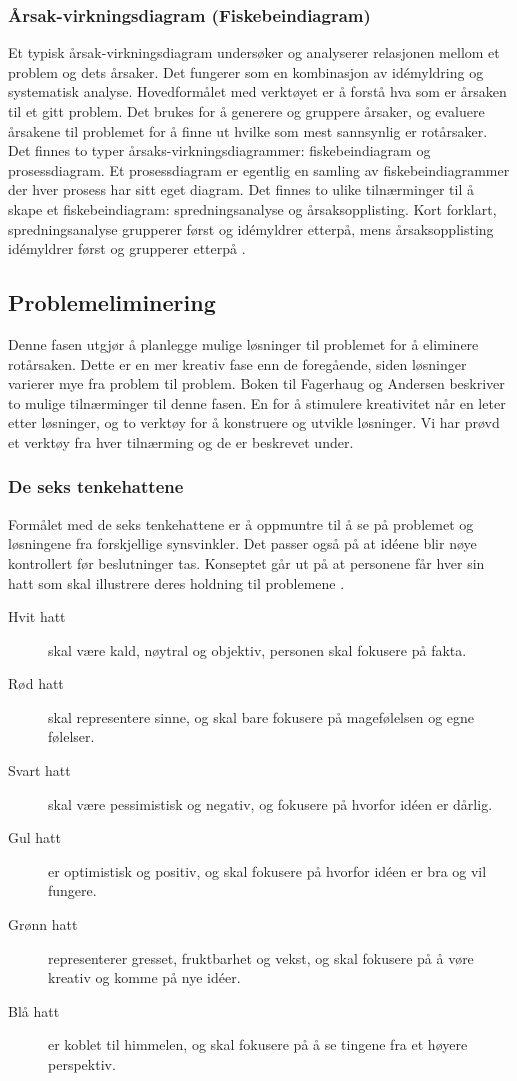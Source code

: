 \subsubsection{Årsak-virkningsdiagram (Fiskebeindiagram)}
Et typisk årsak-virkningsdiagram undersøker og analyserer relasjonen mellom et problem og dets årsaker. Det fungerer som en kombinasjon av idémyldring og systematisk analyse. Hovedformålet med verktøyet er å forstå hva som er årsaken til et gitt problem. Det brukes for å generere og gruppere årsaker, og evaluere årsakene til problemet for å finne ut hvilke som mest sannsynlig er rotårsaker. Det finnes to typer årsaks-virkningsdiagrammer: fiskebeindiagram og prosessdiagram. Et prosessdiagram er egentlig en samling av fiskebeindiagrammer der hver prosess har sitt eget diagram. Det finnes to ulike tilnærminger til å skape et fiskebeindiagram: spredningsanalyse og årsaksopplisting. Kort forklart, spredningsanalyse grupperer først og idémyldrer etterpå, mens årsaksopplisting idémyldrer først og grupperer etterpå \cite{RCA}. 

\subsection{Problemeliminering}
Denne fasen utgjør å planlegge mulige løsninger til problemet for å eliminere rotårsaken. Dette er en mer kreativ fase enn de foregående, siden løsninger varierer mye fra problem til problem. Boken til Fagerhaug og Andersen \cite{RCA} beskriver to mulige tilnærminger til denne fasen. En for å stimulere kreativitet når en leter etter løsninger, og to verktøy for å konstruere og utvikle løsninger. Vi har prøvd et verktøy fra hver tilnærming og de er beskrevet under. 

\subsubsection{De seks tenkehattene}
Formålet med de seks tenkehattene er å oppmuntre til å se på problemet og løsningene fra forskjellige synsvinkler. Det passer også på at idéene blir nøye kontrollert før beslutninger tas. Konseptet går ut på at personene får hver sin hatt som skal illustrere deres holdning til problemene \cite{RCA}. 

\begin{description}
    \item[Hvit hatt] skal være kald, nøytral og objektiv, personen skal fokusere på fakta.
    \item[Rød hatt] skal representere sinne, og skal bare fokusere på magefølelsen og egne følelser.
    \item[Svart hatt] skal være pessimistisk og negativ, og fokusere på hvorfor idéen er dårlig.
    \item[Gul hatt] er optimistisk og positiv, og skal fokusere på hvorfor idéen er bra og vil fungere.
    \item[Grønn hatt] representerer gresset, fruktbarhet og vekst, og skal fokusere på å vøre kreativ og komme på nye idéer.
    \item[Blå hatt] er koblet til himmelen, og skal fokusere på å se tingene fra et høyere perspektiv.
\end{description}

